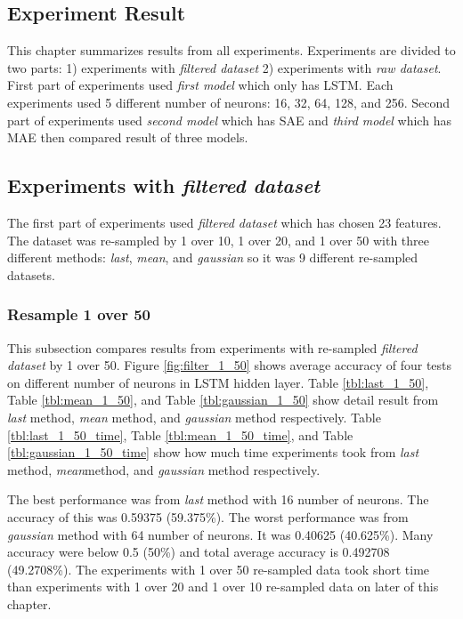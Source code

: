 \documentclass[draft,dvipsnames]{drexel-thesis}
\begin{document}
\begin{thesis}
\chapter{Experiment Result}
This chapter summarizes results from all experiments. Experiments are divided to two parts: 1) experiments with {\em filtered dataset} 2) experiments with {\em raw dataset}. First part of experiments used {\em first model} which only has LSTM. Each experiments used 5 different number of neurons: 16, 32, 64, 128, and 256. Second part of experiments used {\em second model} which has SAE and {\em third model} which has MAE then compared result of three models.

\section{Experiments with {\em filtered dataset}}
The first part of experiments used {\em filtered dataset} which has chosen 23 features. The dataset was re-sampled by 1 over 10, 1 over 20, and 1 over 50 with three different methods: {\em last}, {\em mean}, and {\em gaussian} so it was 9 different re-sampled datasets.

\subsection{Resample 1 over 50}
This subsection compares results from experiments with re-sampled {\em filtered dataset} by 1 over 50. Figure \ref{fig:filter_1_50} shows average accuracy of four tests on different number of neurons in LSTM hidden layer. Table \ref{tbl:last_1_50}, Table \ref{tbl:mean_1_50}, and Table \ref{tbl:gaussian_1_50} show detail result from {\em last} method, {\em mean} method, and {\em gaussian} method respectively. Table \ref{tbl:last_1_50_time}, Table \ref{tbl:mean_1_50_time}, and Table \ref{tbl:gaussian_1_50_time} show how much time experiments took from {\em last} method, {\em mean}method, and {\em gaussian} method respectively.

The best performance was from {\em last} method with 16 number of neurons. The accuracy of this was 0.59375 (59.375\%). The worst performance was from {\em gaussian} method with 64 number of neurons. It was 0.40625 (40.625\%). Many accuracy were below 0.5 (50\%) and total average accuracy is 0.492708 (49.2708\%). The experiments with 1 over 50 re-sampled data took short time than experiments with 1 over 20 and 1 over 10 re-sampled data on later of this chapter.


\end{thesis}
\end{document}
